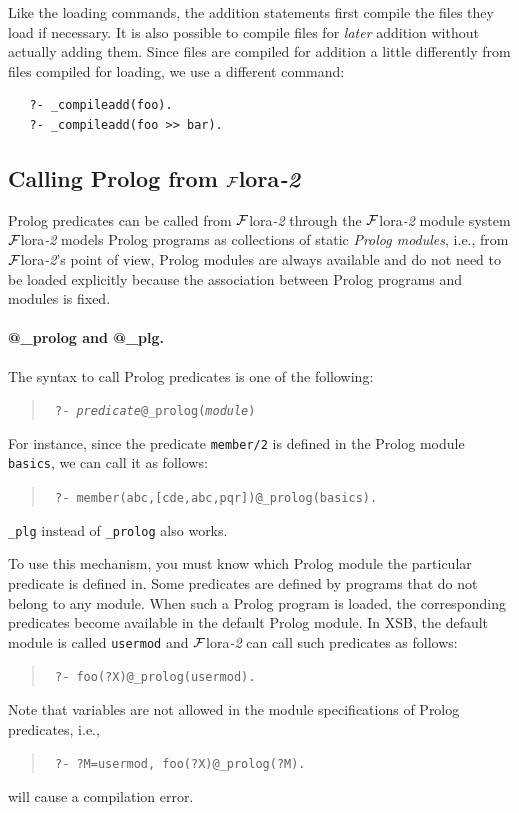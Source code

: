 \documentclass[11pt]{article}
\newcommand{\FLORA}{{\mbox{\sc ${\cal F}${lora}\rm\emph{-2}}}\xspace}
\begin{document}
Like the loading commands, the addition statements
first compile the files they load if necessary.
It is also possible to compile files for \emph{later} addition without
actually adding them. Since files are compiled for addition a little
differently from files compiled for loading, we use a different command:
\begin{verbatim}
   ?- _compileadd(foo).
   ?- _compileadd(foo >> bar).
\end{verbatim}


\subsection{Calling Prolog from \FLORA}\label{sec-prolog-modules}

Prolog predicates can be called from \FLORA through the \FLORA module system
\FLORA models Prolog programs as collections of static {\em Prolog modules},
i.e., from \FLORA's point of view, Prolog modules are always available
and do not need to be loaded explicitly because the association between Prolog
programs and modules is fixed.

\paragraph{@\_prolog and @\_plg.}
The syntax to call Prolog predicates is one of the following:
\begin{quote}
  \tt
 ?- {\it predicate}@\_prolog({\it module})
\end{quote}
For instance, since the predicate {\tt member/2} is defined in the Prolog
module {\tt basics}, we can call it as follows:
\begin{quote}
 \tt
 ?- member(abc,[cde,abc,pqr])@\_prolog(basics).
\end{quote}
{\tt \_plg} instead of {\tt \_prolog} also works.

To use this mechanism, you must know which Prolog module the particular
predicate is defined in. Some predicates are defined by programs that do
not belong to any module. When such a Prolog program is loaded, the
corresponding predicates become available in the default Prolog module.  In
XSB, the default module is called {\tt usermod} and \FLORA can call such
predicates as follows:
\begin{quote}
 \tt
 ?- foo(?X)@\_prolog(usermod).
\end{quote}
Note that variables are not allowed in the module specifications of Prolog
predicates, i.e.,
\begin{quote}
 \tt
 ?- ?M=usermod, foo(?X)@\_prolog(?M).
\end{quote}
will cause a compilation error.
\end{document}
